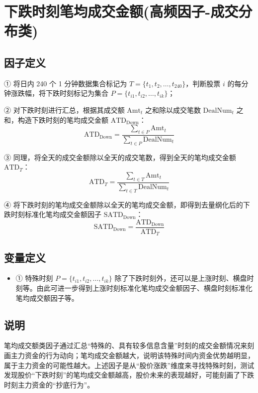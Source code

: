 \documentclass{article}
\begin{document}
\section{下跌时刻笔均成交金额(高频因子-成交分布类)}

\subsection{因子定义}

① 将日内 240 个 1 分钟数据集合标记为 \( T = \{t_1, t_2, \dots, t_{240}\} \)，判断股票 \( i \) 的每分钟涨跌幅，将下跌时刻标记为集合 \( P = \{t_{i1}, t_{i2}, \dots, t_{ik}\} \)；

② 对下跌时刻进行汇总，根据其成交额 \( \mathrm{Amt}_t \) 之和除以成交笔数 \( \mathrm{DealNum}_t \) 之和，构造下跌时刻的笔均成交金额 \( \mathrm{ATD}_{\mathrm{Down}} \)：
\begin{equation}
    \mathrm{ATD}_{\mathrm{Down}} = \frac{\sum_{t \in P} \mathrm{Amt}_t}{\sum_{t \in P} \mathrm{DealNum}_t}
\end{equation}

③ 同理，将全天的成交金额除以全天的成交笔数，得到全天的笔均成交金额 \( \mathrm{ATD}_T \)：
\begin{equation}
    \mathrm{ATD}_T = \frac{\sum_{t \in T} \mathrm{Amt}_t}{\sum_{t \in T} \mathrm{DealNum}_t}
\end{equation}

④ 将下跌时刻的笔均成交金额除以全天的笔均成交金额，即得到去量纲化后的下跌时刻标准化笔均成交金额因子 \( \mathrm{SATD}_{\mathrm{Down}} \)：
\begin{equation}
    \mathrm{SATD}_{\mathrm{Down}} = \frac{\mathrm{ATD}_{\mathrm{Down}}}{\mathrm{ATD}_T}
\end{equation}

\subsection{变量定义}
\begin{itemize}
    \item ① 特殊时刻 \( P = \{t_{i1}, t_{i2}, \dots, t_{ik}\} \) 除了下跌时刻外，还可以是上涨时刻、横盘时刻等。由此可进一步得到上涨时刻标准化笔均成交金额因子、横盘时刻标准化笔均成交额因子等。
\end{itemize}

\subsection{说明}
笔均成交额类因子通过汇总“特殊的、具有较多信息含量”时刻的成交金额情况来刻画主力资金的行为动向；笔均成交金额越大，说明该特殊时间内资金优势越明显，属于主力资金的可能性越大。上述因子是从“股价涨跌”维度来寻找特殊时刻，测试发现股价“下跌时刻”的笔均成交金额越高，股价未来的表现越好，可能刻画了下跌时刻主力资金的“抄底行为”。
\end{document}

